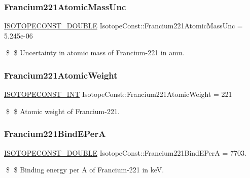 \subsubsection{\texorpdfstring{Francium221\+Atomic\+Mass\+Unc}{Francium221AtomicMassUnc}}
{\footnotesize\ttfamily \mbox{\hyperlink{group___isotope_const-_macros_ga8f45a7272ce02c0b4c65c44636ed719a}{I\+S\+O\+T\+O\+P\+E\+C\+O\+N\+S\+T\+\_\+\+D\+O\+U\+B\+LE}} Isotope\+Const\+::\+Francium221\+Atomic\+Mass\+Unc = 5.\+245e-\/06}

\$ \$ Uncertainty in atomic mass of Francium-\/221 in amu. \mbox{\label{group___isotope_const-_francium-_fr221_gad598235d5a069f57987bef56da3a1cbf}} 
\subsubsection{\texorpdfstring{Francium221\+Atomic\+Weight}{Francium221AtomicWeight}}
{\footnotesize\ttfamily \mbox{\hyperlink{group___isotope_const-_macros_ga5f18360b3e99483a35c32d789e62621c}{I\+S\+O\+T\+O\+P\+E\+C\+O\+N\+S\+T\+\_\+\+I\+NT}} Isotope\+Const\+::\+Francium221\+Atomic\+Weight = 221}

\$ \$ Atomic weight of Francium-\/221. \mbox{\label{group___isotope_const-_francium-_fr221_ga16b33345dc3493223e87ed7e5f603784}} 
\subsubsection{\texorpdfstring{Francium221\+Bind\+E\+PerA}{Francium221BindEPerA}}
{\footnotesize\ttfamily \mbox{\hyperlink{group___isotope_const-_macros_ga8f45a7272ce02c0b4c65c44636ed719a}{I\+S\+O\+T\+O\+P\+E\+C\+O\+N\+S\+T\+\_\+\+D\+O\+U\+B\+LE}} Isotope\+Const\+::\+Francium221\+Bind\+E\+PerA = 7703.}

\$ \$ Binding energy per A of Francium-\/221 in keV. \mbox{\label{group___isotope_const-_francium-_fr221_ga1113543d5ff7dee35d0eaea20eddd276}} 
